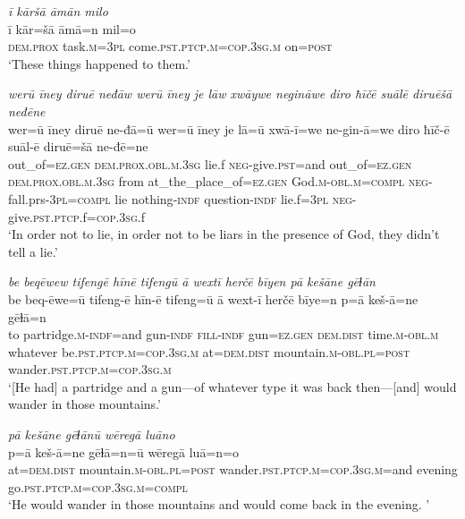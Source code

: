 \ea \label{BP.210}
\textit{ī kāršā āmān milo} \\ 
\gll ī kār=šā āmā=n mil=o \\ 
 \textsc{dem.prox} task\textsc{.m}\textsc{=3pl} come\textsc{.pst}\textsc{.ptcp}\textsc{.m}\textsc{=cop}\textsc{.3sg}\textsc{.m} on\textsc{=\textsc{post}} \\ 
\glt `These things happened to them.'
\z 
 
\ea \label{BP.211}
\textit{werū īney diruē neđāw werū īney je lāw xwāywe negināwe diro ħīčē suālē diruēšā neđēne} \\ 
\gll wer=ū īney diruē ne-đā=ū wer=ū īney je lā=ū xwā-ī=we ne-gin-ā=we diro ħīč-ē suāl-ē diruē=šā ne-đē=ne \\ 
 out\_of\textsc{=ez.gen} \textsc{dem.prox}\textsc{.obl}\textsc{.m}\textsc{.3sg} lie.f \textsc{neg-}give\textsc{.pst}=and out\_of\textsc{=ez.gen} \textsc{dem.prox}\textsc{.obl}\textsc{.m}\textsc{.3sg} from at\_the\_place\_of\textsc{=ez.gen} God\textsc{.m}\textsc{-obl}\textsc{.m}\textsc{=compl} \textsc{neg-}fall.prs\textsc{-3pl}\textsc{=compl} lie nothing\textsc{-indf} question\textsc{-indf} lie.f\textsc{=3pl} \textsc{neg-}give\textsc{.pst}\textsc{.ptcp}.f\textsc{=cop}\textsc{.3sg}.f \\ 
\glt `In order not to lie, in order not to be liars in the presence of God, they didn’t tell a lie.'
\z 
 
\ea \label{ŠJ.7}
\textit{be beqēwew tifengē hīnē tifengū ā wextī herčē bīyen pā kešāne gēɫān} \\ 
\gll be beq-ēwe=ū tifeng-ē hīn-ē tifeng=ū ā wext-ī herčē bīye=n p=ā keš-ā=ne gēɫā=n \\ 
 to partridge\textsc{.m}\textsc{-indf}=and gun\textsc{-indf} \textsc{fill}\textsc{-indf} gun\textsc{=ez.gen} \textsc{dem.dist} time\textsc{.m}\textsc{-obl}\textsc{.m} whatever be\textsc{.pst}\textsc{.ptcp}\textsc{.m}\textsc{=cop}\textsc{.3sg}\textsc{.m} at=\textsc{dem.dist} mountain\textsc{.m}\textsc{-obl}\textsc{.pl}\textsc{=\textsc{post}} wander\textsc{.pst}\textsc{.ptcp}\textsc{.m}\textsc{=cop}\textsc{.3sg}\textsc{.m} \\ 
\glt `[He had] a partridge and a gun—of whatever type it was back then—[and] would wander in those mountains.'
\z 
 
\ea \label{ŠJ.8}
\textit{pā kešāne gēɫānū wēregā luāno} \\ 
\gll p=ā keš-ā=ne gēɫā=n=ū wēregā luā=n=o \\ 
 at=\textsc{dem.dist} mountain\textsc{.m}\textsc{-obl}\textsc{.pl}\textsc{=\textsc{post}} wander\textsc{.pst}\textsc{.ptcp}\textsc{.m}\textsc{=cop}\textsc{.3sg}\textsc{.m}=and evening go\textsc{.pst}\textsc{.ptcp}\textsc{.m}\textsc{=cop}\textsc{.3sg}\textsc{.m}\textsc{=compl} \\ 
\glt `He would wander in those mountains and would come back in the evening. '
\z 
 

